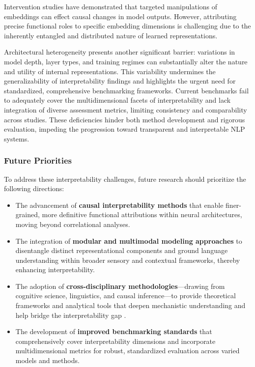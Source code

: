 Intervention studies have demonstrated that targeted manipulations of embeddings can effect causal changes in model outputs. However, attributing precise functional roles to specific embedding dimensions is challenging due to the inherently entangled and distributed nature of learned representations.

Architectural heterogeneity presents another significant barrier: variations in model depth, layer types, and training regimes can substantially alter the nature and utility of internal representations. This variability undermines the generalizability of interpretability findings and highlights the urgent need for standardized, comprehensive benchmarking frameworks. Current benchmarks fail to adequately cover the multidimensional facets of interpretability and lack integration of diverse assessment metrics, limiting consistency and comparability across studies. These deficiencies hinder both method development and rigorous evaluation, impeding the progression toward transparent and interpretable NLP systems.

\subsubsection{Future Priorities}

To address these interpretability challenges, future research should prioritize the following directions:

\begin{itemize}
  \item The advancement of \textbf{causal interpretability methods} that enable finer-grained, more definitive functional attributions within neural architectures, moving beyond correlational analyses.
  \item The integration of \textbf{modular and multimodal modeling approaches} to disentangle distinct representational components and ground language understanding within broader sensory and contextual frameworks, thereby enhancing interpretability.
  \item The adoption of \textbf{cross-disciplinary methodologies}—drawing from cognitive science, linguistics, and causal inference—to provide theoretical frameworks and analytical tools that deepen mechanistic understanding and help bridge the interpretability gap \cite{ref36}.
  \item The development of \textbf{improved benchmarking standards} that comprehensively cover interpretability dimensions and incorporate multidimensional metrics for robust, standardized evaluation across varied models and methods.
\end{itemize}

